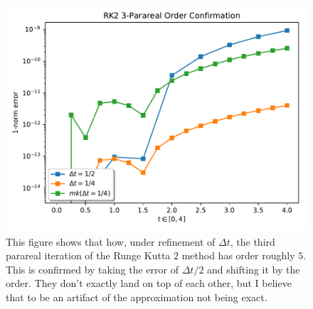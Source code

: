 \begin{figure}[!htb]
  \centering
  \includegraphics[width=.75\textwidth]{./resources/rk2_order_conf}
  \caption{This figure shows that how, under refinement of $\Delta t$, the third
    parareal iteration of the Runge Kutta $2$ method has order roughly
    $5$. This is confirmed by taking the error of $\Delta t/2$ and shifting it
    by the order. They don't exactly land on top of each other, but I believe
    that to be an artifact of the approximation not being exact.}\label{fig:order_conf}
\end{figure}

